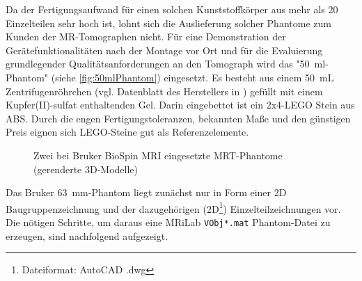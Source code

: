  Da der Fertigungsaufwand für einen solchen Kunststoffkörper aus mehr als 20 Einzelteilen sehr hoch ist, lohnt sich die Auslieferung solcher Phantome zum Kunden der MR-Tomographen nicht. Für eine Demonstration der Gerätefunktionalitäten nach der Montage vor Ort und für die Evaluierung grundlegender Qualitätsanforderungen an den Tomograph wird das "50~ml-Phantom" (siehe \autoref{fig:50mlPhantom}) eingesetzt. Es besteht aus einem \SI{50}{\milli\liter} Zentrifugenröhrchen (vgl. Datenblatt des Herstellers in \cite{corningCentriStar}) gefüllt mit einem Kupfer(II)-sulfat enthaltenden Gel. Darin eingebettet ist ein 2x4-LEGO Stein aus ABS. Durch die engen Fertigungstoleranzen, bekannten Maße und den günstigen Preis eignen sich LEGO-Steine gut als Referenzelemente.

\begin{figure}[H]
	\centering
	\hfill
	\caption[Bruker Phantome]{Zwei bei Bruker BioSpin MRI eingesetzte MRT-Phantome (gerenderte 3D-Modelle)}
\end{figure}

Das Bruker 63~mm-Phantom liegt zunächst nur in Form einer 2D Baugruppenzeichnung und der dazugehörigen (2D\footnote{Dateiformat: AutoCAD .dwg}) Einzelteilzeichnungen vor. Die nötigen Schritte, um daraus eine MRiLab \texttt{VObj*.mat} Phantom-Datei zu erzeugen, sind nachfolgend aufgezeigt.

